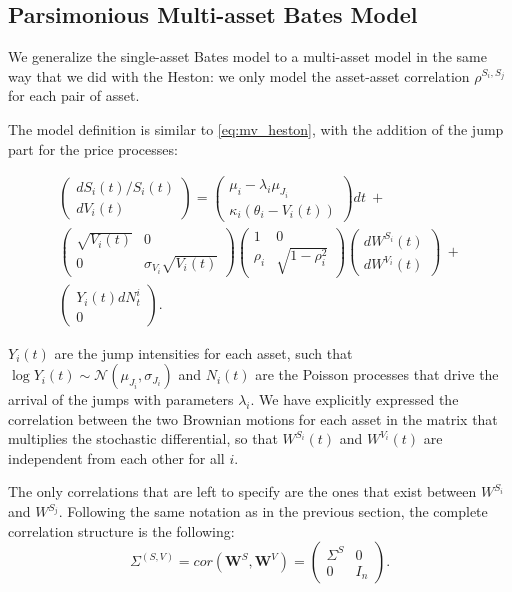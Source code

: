 \subsection{Parsimonious Multi-asset Bates Model}
We  generalize the single-asset Bates model to a multi-asset model in the same way that we did with the Heston: we only model the asset-asset correlation $\rho^{S_i, S_j}$ for each pair of asset.

The model definition  is similar to \eqref{eq:mv_heston}, with the addition of the jump part for the price processes:

\begin{multline}
\begin{pmatrix}
dS_i(t) / S_i(t)\\
dV_i(t)
\end{pmatrix}
= \begin{pmatrix}
\mu_i - \lambda_i \mu_{J_i}\\
\kappa_i (\theta_i - V_i(t))
\end{pmatrix}
dt  \:+\\ 
\begin{pmatrix}
\sqrt{V_i(t)} & 0 \\
0 & \sigma_{V_i} \sqrt{V_i(t)} 
\end{pmatrix}
\begin{pmatrix}
1 & 0 \\
\rho_i & \sqrt{1-\rho_i^2} 
\end{pmatrix}
\begin{pmatrix}
dW^{S_i}(t)\\
dW^{V_i }(t)
\end{pmatrix}
\: + \\
\begin{pmatrix}
Y_i(t) dN^i_t  \\
0   
\end{pmatrix}.
\end{multline}

$Y_i(t)$ are the jump intensities for each asset, such that $\log Y_i(t) \sim \mathcal{N}(\mu_{J_i}, \sigma_{J_i})$ and $N_i(t)$ are the Poisson processes that drive the arrival of the jumps with parameters $\lambda_i$.
We have explicitly expressed the correlation between the two Brownian motions for each asset in the matrix that multiplies the stochastic differential, so that $W^{S_i}(t)$ and $W^{V_i}(t)$ are independent from each other for all $i$.

The only correlations that are left to specify are the ones that exist between $W^{S_i}$ and $W^{S_j}$. Following the same notation as in the previous section, the complete correlation structure is the following:
\begin{equation}
\label{eq:bates_cor}
\Sigma^{(S,V)} = cor(\boldsymbol{W}^{S}, \boldsymbol{W}^{V}) = \begin{pmatrix}
\Sigma^{S} & 0 \\
0& I_n
\end{pmatrix}.
\end{equation}

